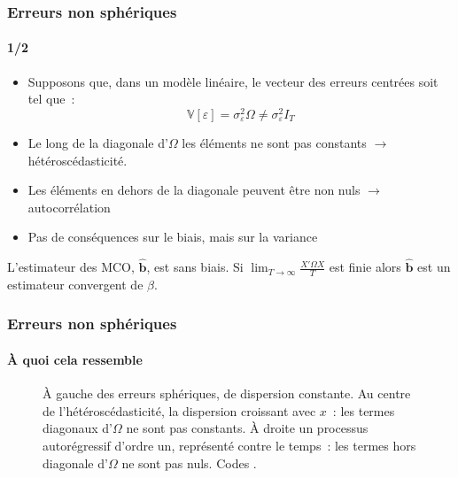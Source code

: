\documentclass[10pt]{beamer}
\begin{document}
\begin{frame}
  \frametitle{Erreurs non sphériques}
  \framesubtitle{1/2}

  \begin{itemize}

  \item Supposons que, dans un modèle linéaire, le vecteur des erreurs centrées soit tel que~:
    \[
      \mathbb V[\varepsilon] = \sigma_{\varepsilon}^2\Omega \neq \sigma_{\varepsilon}^2 I_T
    \]

  \item Le long de la diagonale d'$\Omega$ les éléments ne sont pas constants $\rightarrow$ hétéroscédasticité.\newline

  \item Les éléments en dehors de la diagonale peuvent être non nuls $\rightarrow$ autocorrélation\newline

  \item Pas de conséquences sur le biais, mais sur la variance

  \end{itemize}


  \begin{prop}\label{prop:bhat:non-spherical-errors-1}
    L'estimateur des MCO, $\hat{\mathbf b}$, est sans biais. Si $\lim_{T\rightarrow\infty}\frac{X'\Omega X}{T}$ est finie alors $\hat{\mathbf b}$ est un estimateur convergent de $\beta$.
  \end{prop}

\end{frame}


\begin{frame}[c]
  \frametitle{Erreurs non sphériques}
  \framesubtitle{À quoi cela ressemble}

  \begin{figure}
    \centering
    \scalebox{.34}{}
    \caption{À gauche des erreurs sphériques, de dispersion constante. Au centre de
      l'hétéroscédasticité, la dispersion croissant avec $x$~: les termes diagonaux
      d'$\Omega$ ne sont pas constants. À droite un processus autorégressif d'ordre un,
      représenté contre le temps~: les termes hors diagonale d'$\Omega$ ne sont pas
      nuls. Codes .}
  \end{figure}

\end{frame}
\end{document}
